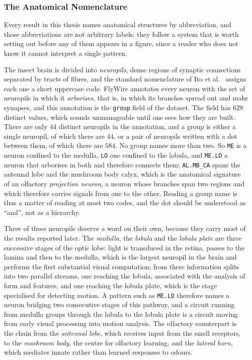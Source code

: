 \documentclass[12pt,a4paper,oneside]{article}
\theoremstyle{definition}
\theoremstyle{plain}
\newcommand{\code}[1]{\texttt{#1}}
\begin{document}
\subsubsection{The Anatomical Nomenclature}
\label{sec:nomenclature}

Every result in this thesis names anatomical structures by abbreviation, and
those abbreviations are not arbitrary labels: they follow a system that is
worth setting out before any of them appears in a figure, since a reader who
does not know it cannot interpret a single pattern.

The insect brain is divided into \emph{neuropils}, dense regions of
synaptic connections separated by tracts of fibres, and the standard
nomenclature of Ito et al.\ \cite{ito2014} assigns each one a short
uppercase code. FlyWire annotates every neuron with the set of neuropils in
which it \emph{arborises}, that is, in which its branches spread out and make
synapses, and this annotation is the \code{group} field of the dataset. The field has $628$ distinct values, which sounds unmanageable
until one sees how they are built. There are only $44$ distinct neuropils in
the annotation, and a group is either a single neuropil, of which there are
$44$, or a pair of neuropils written with a dot between them, of which there
are $584$. No group names more than two. So \code{ME} is a neuron confined to
the medulla, \code{LO} one confined to the lobula, and \code{ME.LO} a neuron
that arborises in both and therefore connects them; \code{AL.MB\_CA} spans
the antennal lobe and the mushroom body calyx, which is the anatomical
signature of an olfactory \emph{projection neuron}, a neuron whose branches
span two regions and which therefore carries signals from one to the other.
Reading a group name is thus a
matter of reading at most two codes, and the dot should be understood as
``and'', not as a hierarchy.

Three of these neuropils deserve a word on their own, because they carry
most of the results reported later. The \emph{medulla}, the \emph{lobula} and
the \emph{lobula plate} are three successive stages of the optic lobe: light
is transduced in the retina, passes to the lamina and then to the medulla,
which is the largest neuropil in the brain and performs the first substantial
visual computation; from there information splits into two parallel streams,
one reaching the lobula, associated with the analysis of form and features,
and one reaching the lobula plate, which is the stage specialised for
detecting motion. A pattern such as \code{ME.LO} therefore names a neuron
bridging two consecutive stages of this pathway, and a circuit running from
medulla groups through the lobula to the lobula plate is a circuit moving
from early visual processing into motion analysis. The olfactory counterpart
is the chain from the \emph{antennal lobe}, which receives input from the
smell receptors, to the \emph{mushroom body}, the centre for olfactory
learning, and the \emph{lateral horn}, which mediates innate rather than
learned responses to odours.
\end{document}
